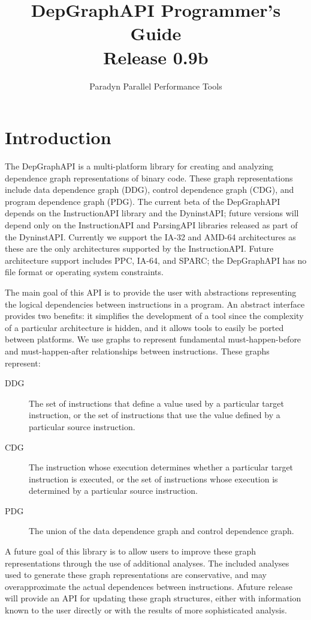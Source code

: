 \documentclass[12pt]{article}
\begin{document}
\title{DepGraphAPI Programmer's Guide \\ Release 0.9b}
\author{Paradyn Parallel Performance Tools}
\maketitle
\section{Introduction}

The DepGraphAPI is a multi-platform library for creating and analyzing
dependence graph representations of binary code. These graph
representations include data dependence graph (DDG), control
dependence graph (CDG), and program dependence graph (PDG). The
current beta of the DepGraphAPI depends on the InstructionAPI library
and the DyninstAPI; future versions will depend only on the
InstructionAPI and ParsingAPI libraries released as part of the
DyninstAPI. Currently we support the IA-32 and AMD-64 architectures as
these are the only architectures supported by the
InstructionAPI. Future architecture support includes PPC, IA-64, and
SPARC; the DepGraphAPI has no file format or operating system
constraints.

The main goal of this API is to provide the user with abstractions
representing the logical dependencies between instructions in a
program. An abstract interface provides two benefits: it simplifies
the development of a tool since the complexity of a particular
architecture is hidden, and it allows tools to easily be ported
between platforms. We use graphs to represent fundamental
must-happen-before and must-happen-after relationships between
instructions. These graphs represent:
\begin{description}
\item[DDG] The set of instructions that define a value used by a
particular target instruction, or the set of instructions that use the
value defined by a particular source instruction.
\item[CDG] The instruction whose execution determines whether a
particular target instruction is executed, or the set of instructions
whose execution is determined by a particular source instruction.
\item[PDG] The union of the data dependence graph and control
dependence graph.
\end{description}

A future goal of this library is to allow users to improve these graph
representations through the use of additional analyses. The included
analyses used to generate these graph representations are
conservative, and may overapproximate the actual dependences between
instructions. Afuture release will provide an API for updating these
graph structures, either with information known to the user directly
or with the results of more sophisticated analysis.
\end{document}
